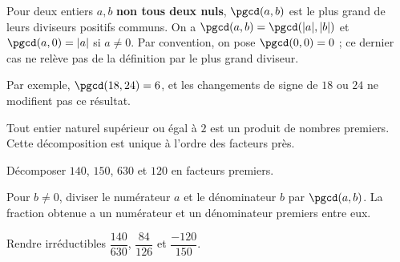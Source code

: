 \begin{keypoint}
Pour deux entiers $a,b$ \textbf{non tous deux nuls}, $\pgcd(a,b)$ est le plus grand de leurs diviseurs positifs communs. On a $\pgcd(a,b)=\pgcd(|a|,|b|)$ et $\pgcd(a,0)=|a|$ si $a\ne0$. Par convention, on pose $\pgcd(0,0)=0$ ; ce dernier cas ne relève pas de la définition par le plus grand diviseur.
\end{keypoint}
Par exemple, $\pgcd(18,24)=6$, et les changements de signe de $18$ ou $24$ ne modifient pas ce résultat.
\begin{keypoint}
Tout entier naturel supérieur ou égal à $2$ est un produit de nombres premiers. Cette décomposition est unique à l'ordre des facteurs près.
\end{keypoint}
\begin{example}Décomposer $140$, $150$, $630$ et $120$ en facteurs premiers.\end{example}
\begin{method}
Pour $b\ne0$, diviser le numérateur $a$ et le dénominateur $b$ par $\pgcd(a,b)$. La fraction obtenue a un numérateur et un dénominateur premiers entre eux.
\end{method}
\begin{example}Rendre irréductibles $\dfrac{140}{630}$, $\dfrac{84}{126}$ et $\dfrac{-120}{150}$.\end{example}

